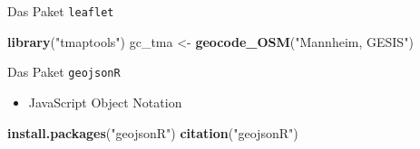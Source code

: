 \documentclass[ignorenonframetext,]{beamer}
\newenvironment{Shaded}{\begin{snugshade}}{\end{snugshade}}
\newcommand{\KeywordTok}[1]{\textcolor[rgb]{0.13,0.29,0.53}{\textbf{#1}}}
\newcommand{\DataTypeTok}[1]{\textcolor[rgb]{0.13,0.29,0.53}{#1}}
\newcommand{\FloatTok}[1]{\textcolor[rgb]{0.00,0.00,0.81}{#1}}
\newcommand{\StringTok}[1]{\textcolor[rgb]{0.31,0.60,0.02}{#1}}
\newcommand{\OperatorTok}[1]{\textcolor[rgb]{0.81,0.36,0.00}{\textbf{#1}}}
\newcommand{\NormalTok}[1]{#1}
\providecommand{\tightlist}{%
  \setlength{\itemsep}{0pt}\setlength{\parskip}{0pt}}
\begin{document}
\begin{frame}[fragile]{Das Paket \texttt{leaflet}}

\begin{Shaded}
\begin{Highlighting}[]
\KeywordTok{library}\NormalTok{(}\StringTok{"tmaptools"}\NormalTok{)}
\NormalTok{gc_tma <-}\StringTok{ }\KeywordTok{geocode_OSM}\NormalTok{(}\StringTok{"Mannheim, GESIS"}\NormalTok{)}
\end{Highlighting}
\end{Shaded}

\begin{Shaded}
\end{Shaded}

\end{frame}

\begin{frame}[fragile]{Das Paket \texttt{geojsonR}}

\begin{itemize}
\tightlist
\item
  JavaScript Object Notation
\end{itemize}

\begin{Shaded}
\begin{Highlighting}[]
\KeywordTok{install.packages}\NormalTok{(}\StringTok{"geojsonR"}\NormalTok{)}
\KeywordTok{citation}\NormalTok{(}\StringTok{"geojsonR"}\NormalTok{)}
\end{Highlighting}
\end{Shaded}

\end{frame}
\end{document}
